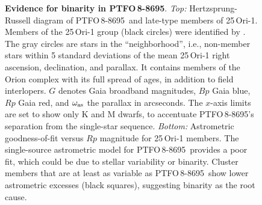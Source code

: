 \documentclass[12pt,twocolumn,tighten]{aastex62}
\newcommand{\ptfo}{PTFO$\,$8-8695}
\begin{document}
\begin{figure}[t]
	\begin{center}
		\leavevmode
		
		\vspace{-0.7cm}
	\end{center}
	\vspace{-0.7cm}
	\caption{ {\bf Evidence for binarity in \ptfo}.
    {\it Top:} Hertzsprung-Russell diagram of \ptfo\ and late-type
    members of 25$\,$Ori-1. Members of the 25$\,$Ori-1 group (black
    circles) were identified by \citet{kounkel_apogee2_2018}.  The
    gray circles are stars in the ``neighborhood'', i.e., non-member
    stars within 5 standard deviations of the mean 25$\,$Ori-1 right
    ascension, declination, and parallax.  It contains members of the
    Orion complex with its full spread of ages, in addition to field
    interlopers.  $G$ denotes Gaia broadband magnitudes, $Bp$ Gaia
    blue, $Rp$ Gaia red, and $\omega_{\rm as}$ the parallax in
    arcseconds.  The $x$-axis limits are set to show only K and M
    dwarfs, to accentuate \ptfo's separation from the single-star
    sequence.  {\it Bottom:} Astrometric goodness-of-fit versus $Rp$
    magnitude for 25$\,$Ori-1 members.  The single-source astrometric
    model for \ptfo\ provides a poor fit, which could be due to
    stellar variability or binarity.  Cluster members that are at
    least as variable as \ptfo\ show lower astrometric excesses (black
    squares), suggesting binarity as the root cause.
		\label{fig:gaia}
	}
\end{figure}
\end{document}

